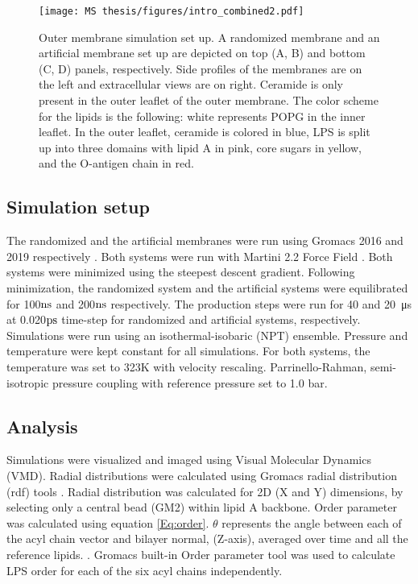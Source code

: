 \documentclass[10pt, letterpaper]{article}
\begin{document}
\begin{figure}[H]
  \centerline{\texttt{[image: MS thesis/figures/intro\_combined2.pdf]}}
  \caption[Random and Artificial outer membrane System set up]{Outer membrane simulation set up. A randomized membrane and an artificial membrane set up are depicted on top (A, B) and bottom (C, D) panels, respectively. Side profiles of the membranes are on the left and extracellular views are on right. Ceramide is only present in the outer leaflet of the outer membrane.
  The color scheme for the lipids is the following: white represents POPG in the inner leaflet. In the outer leaflet, ceramide is colored in blue, LPS is split up into three domains with lipid A in pink, core sugars in yellow, and the O-antigen chain in red.}\label{fig:intro}
\end{figure}

\subsection{Simulation setup}
The randomized and the artificial membranes were run using Gromacs 2016 and 2019 respectively \cite{abraham2015gromacs}. Both systems were run with Martini 2.2 Force Field  \cite{marrink2007martini}. Both systems were minimized using the steepest descent gradient. Following minimization, the randomized system and the artificial systems were equilibrated for 100$\rm ns$ and 200$\rm ns$ respectively. The production steps were run for 40 and \SI{20}{\micro\second} at 0.020$\rm ps$ time-step for randomized and artificial systems, respectively. Simulations were run using an isothermal-isobaric (NPT) ensemble. Pressure and temperature were kept constant for all simulations. For both systems, the temperature was set to 323K with velocity rescaling. Parrinello-Rahman, semi-isotropic pressure coupling with reference pressure set to 1.0 bar.

\subsection{Analysis}
Simulations were visualized and imaged using Visual Molecular Dynamics (VMD)\cite{humphrey1996vmd}. Radial distributions were calculated using Gromacs radial distribution (rdf) tools \cite{abraham2015gromacs}. Radial distribution was calculated for 2D (X and Y) dimensions, by selecting only a central bead (GM2) within lipid A backbone. Order parameter was calculated using equation \ref{Eq:order}. $\theta$ represents the angle between each of the acyl chain vector and bilayer normal, (Z-axis), averaged over time and all the reference lipids. \cite{piggot2017calculation}. Gromacs built-in Order parameter tool was used to calculate LPS order for each of the six acyl chains independently.
\end{document}
